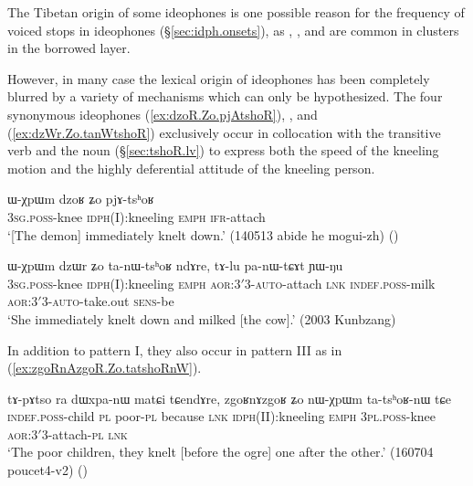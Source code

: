 The Tibetan origin of some ideophones is one possible reason for the frequency of voiced stops in ideophones (§\ref{sec:idph.onsets}), as , ,  and  are common in clusters in the borrowed layer.

However, in many case the lexical origin of ideophones has been completely blurred by a variety of mechanisms which can only be hypothesized. The four synonymous ideophones  (\ref{ex:dzoR.Zo.pjAtshoR}), ,  and  (\ref{ex:dzWr.Zo.tanWtshoR}) exclusively occur in collocation with the transitive verb  and the noun  (§\ref{sec:tshoR.lv}) to express both the speed of the kneeling motion and the highly deferential attitude of the kneeling person.  

\begin{exe}
\ex \label{ex:dzoR.Zo.pjAtshoR}
\gll ɯ-χpɯm dzoʁ ʑo pjɤ-tsʰoʁ \\
\textsc{3sg}.\textsc{poss}-knee \textsc{idph}(I):kneeling \textsc{emph} \textsc{ifr}-attach \\
\glt `[The demon] immediately knelt down.' (140513 abide he mogui-zh) ()
\end{exe}

\begin{exe}
\ex \label{ex:dzWr.Zo.tanWtshoR}
\gll ɯ-χpɯm dzɯr ʑo ta-nɯ-tsʰoʁ ndɤre, tɤ-lu pa-nɯ-tɕɤt ɲɯ-ŋu \\
 \textsc{3sg}.\textsc{poss}-knee \textsc{idph}(I):kneeling \textsc{emph} \textsc{aor}:3$'$\fl{}3-\textsc{auto}-attach \textsc{lnk} \textsc{indef}.\textsc{poss}-milk \textsc{aor}:3$'$\fl{}3-\textsc{auto}-take.out \textsc{sens}-be \\
 \glt `She immediately knelt down and milked [the cow].' (2003 Kunbzang)
\end{exe}

In addition to pattern I, they also occur in pattern III as in (\ref{ex:zgoRnAzgoR.Zo.tatshoRnW}).

\begin{exe}
\ex \label{ex:zgoRnAzgoR.Zo.tatshoRnW}
\gll  tɤ-pɤtso ra dɯxpa-nɯ matɕi tɕendɤre, zgoʁnɤzgoʁ ʑo nɯ-χpɯm ta-tsʰoʁ-nɯ tɕe \\
\textsc{indef}.\textsc{poss}-child \textsc{pl} poor-\textsc{pl} because \textsc{lnk} \textsc{idph}(II):kneeling \textsc{emph}  \textsc{3pl}.\textsc{poss}-knee \textsc{aor}:3$'$\fl{}3-attach-\textsc{pl} \textsc{lnk} \\
\glt `The poor children, they knelt [before the ogre] one after the other.' (160704 poucet4-v2)
()
\end{exe}


